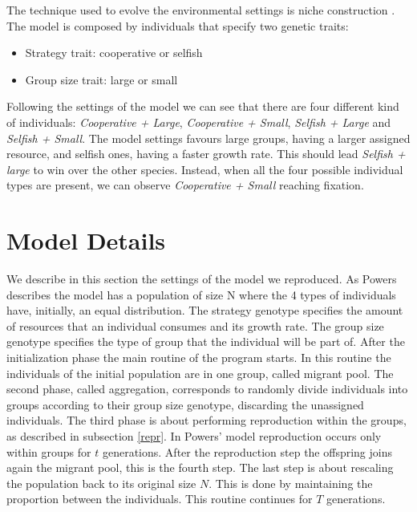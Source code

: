 \documentclass[runningheads]{llncs}
\begin{document}
The technique used to evolve the environmental settings is niche
construction \cite{b10}. The model is composed by individuals that
specify two genetic traits:
\begin{itemize}
\item Strategy trait: cooperative or selfish
\item Group size trait: large or small
\end{itemize}
Following the settings of the model we can see that there are four
different kind of individuals: \textit{Cooperative + Large},
\textit{Cooperative + Small}, \textit{Selfish + Large} and
\textit{Selfish + Small}.
The model settings favours large groups, having a larger assigned
resource, and selfish ones, having a faster growth rate. This should lead
\textit{Selfish + large} to win over the other species. Instead, when
all the four possible individual types are present, we can observe
\textit{Cooperative + Small} reaching fixation.

\section{Model Details}
We describe in this section the settings of the model we
reproduced. As Powers describes \cite{groups} the model has a
population of size N where the 4 types of individuals have, initially,
an equal distribution. The strategy genotype specifies the amount of
resources that an individual consumes and its growth rate. The group
size genotype specifies the type of group that the individual will be
part of. After the initialization phase the main routine of the
program starts. In this routine the individuals of the initial
population are in one group, called migrant pool. The second phase,
called aggregation, corresponds to randomly divide individuals into
groups according to their group size genotype, discarding the
unassigned individuals. The third phase is about performing reproduction
within the groups, as described in subsection \ref{repr}. In Powers'
model reproduction occurs only within groups for $t$ generations. After the reproduction
step the offspring joins again the migrant pool, this is the fourth
step. The last step is about rescaling the population back to its
original size $N$. This is done by maintaining the proportion between
the individuals. This routine continues for $T$ generations.
\end{document}
